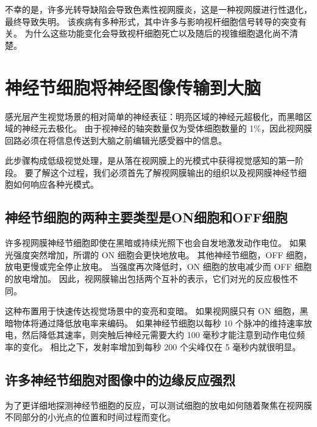 不幸的是，许多光转导缺陷会导致色素性视网膜炎，这是一种视网膜进行性退化，最终导致失明。 
该疾病有多种形式，其中许多与影响视杆细胞信号转导的突变有关。 
为什么这些功能变化会导致视杆细胞死亡以及随后的视锥细胞退化尚不清楚。


\section{神经节细胞将神经图像传输到大脑}
感光层产生视觉场景的相对简单的神经表征：明亮区域的神经元超极化，而黑暗区域的神经元去极化。 
由于视神经的轴突数量仅为受体细胞数量的 1\%，因此视网膜回路必须在将信息传送到大脑之前编辑光感受器中的信息。


此步骤构成低级视觉处理，是从落在视网膜上的光模式中获得视觉感知的第一阶段。 
要了解这个过程，我们必须首先了解视网膜输出的组织以及视网膜神经节细胞如何响应各种光模式。


\subsection{神经节细胞的两种主要类型是ON细胞和OFF细胞}
许多视网膜神经节细胞即使在黑暗或持续光照下也会自发地激发动作电位。 
如果光强度突然增加，所谓的 ON 细胞会更快地放电。 
其他神经节细胞，OFF 细胞，放电更慢或完全停止放电。 
当强度再次降低时，ON 细胞的放电减少而 OFF 细胞的放电增加。 
因此，视网膜输出包括两个互补的表示，它们对光的反应极性不同。


这种布置用于快速传达视觉场景中的变亮和变暗。 
如果视网膜只有 ON 细胞，黑暗物体将通过降低放电率来编码。 
如果神经节细胞以每秒 10 个脉冲的维持速率放电，然后降低其速率，则突触后神经元需要大约 100 毫秒才能注意到动作电位频率的变化。 
相比之下，发射率增加到每秒 200 个尖峰仅在 5 毫秒内就很明显。


\subsection{许多神经节细胞对图像中的边缘反应强烈}
为了更详细地探测神经节细胞的反应，可以测试细胞的放电如何随着聚焦在视网膜不同部分的小光点的位置和时间过程而变化。


